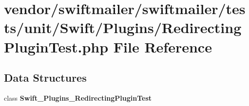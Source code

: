 \section{vendor/swiftmailer/swiftmailer/tests/unit/\+Swift/\+Plugins/\+Redirecting\+Plugin\+Test.php File Reference}
\label{_redirecting_plugin_test_8php}
\subsection*{Data Structures}
\begin{DoxyCompactItemize}
\item 
class {\bf Swift\+\_\+\+Plugins\+\_\+\+Redirecting\+Plugin\+Test}
\end{DoxyCompactItemize}
